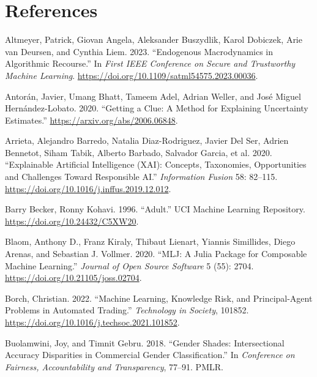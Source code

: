 \documentclass{juliacon}
\newlength{\cslhangindent}
\newlength{\cslentryspacingunit} %
\newenvironment{CSLReferences}[2] %
 {%
  \setlength{\parindent}{0pt}
  \ifodd #1
  \let\oldpar\par
  \def\par{\hangindent=\cslhangindent\oldpar}
  \fi
  \setlength{\parskip}{#2\cslentryspacingunit}
 }%
 {}
\begin{document}
\hypertarget{references}{%
\section*{References}\label{references}}

\hypertarget{refs}{}
\begin{CSLReferences}{1}{0}
\leavevmode{}%
Altmeyer, Patrick, Giovan Angela, Aleksander Buszydlik, Karol Dobiczek,
Arie van Deursen, and Cynthia Liem. 2023. {``Endogenous {Macrodynamics}
in {Algorithmic} {Recourse}.''} In \emph{First {IEEE} {Conference} on
{Secure} and {Trustworthy} {Machine} {Learning}}.
\url{https://doi.org/10.1109/satml54575.2023.00036}.

\leavevmode{}%
Antorán, Javier, Umang Bhatt, Tameem Adel, Adrian Weller, and José
Miguel Hernández-Lobato. 2020. {``Getting a Clue: {A} Method for
Explaining Uncertainty Estimates.''}
\url{https://arxiv.org/abs/2006.06848}.

\leavevmode{}%
Arrieta, Alejandro Barredo, Natalia Diaz-Rodriguez, Javier Del Ser,
Adrien Bennetot, Siham Tabik, Alberto Barbado, Salvador Garcia, et al.
2020. {``Explainable {Artificial Intelligence} ({XAI}): {Concepts},
Taxonomies, Opportunities and Challenges Toward Responsible {AI}.''}
\emph{Information Fusion} 58: 82--115.
\url{https://doi.org/10.1016/j.inffus.2019.12.012}.

\leavevmode{}%
Barry Becker, Ronny Kohavi. 1996. {``Adult.''} UCI Machine Learning
Repository. \url{https://doi.org/10.24432/C5XW20}.

\leavevmode{}%
Blaom, Anthony D., Franz Kiraly, Thibaut Lienart, Yiannis Simillides,
Diego Arenas, and Sebastian J. Vollmer. 2020. {``{MLJ}: {A Julia}
Package for Composable Machine Learning.''} \emph{Journal of Open Source
Software} 5 (55): 2704. \url{https://doi.org/10.21105/joss.02704}.

\leavevmode{}%
Borch, Christian. 2022. {``Machine Learning, Knowledge Risk, and
Principal-Agent Problems in Automated Trading.''} \emph{Technology in
Society}, 101852. \url{https://doi.org/10.1016/j.techsoc.2021.101852}.

\leavevmode{}%
Buolamwini, Joy, and Timnit Gebru. 2018. {``Gender Shades:
{Intersectional} Accuracy Disparities in Commercial Gender
Classification.''} In \emph{Conference on Fairness, Accountability and
Transparency}, 77--91. {PMLR}.


\end{CSLReferences}
\end{document}
